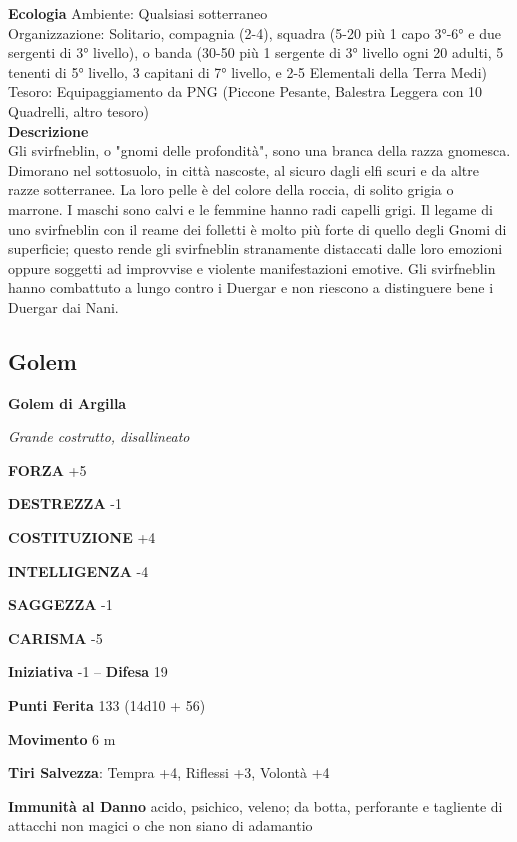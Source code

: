 \begin{multicols}{2}
\textbf{Ecologia}
Ambiente: Qualsiasi sotterraneo\\
Organizzazione: Solitario, compagnia (2-4), squadra (5-20 più 1 capo 3°-6° e due sergenti di 3° livello), o banda (30-50 più 1 sergente di 3° livello ogni 20 adulti, 5 tenenti di 5° livello, 3 capitani di 7° livello, e 2-5 Elementali della Terra Medi)\\
Tesoro: Equipaggiamento da PNG (Piccone Pesante, Balestra Leggera con 10 Quadrelli, altro tesoro)\\
\textbf{Descrizione}\\
Gli svirfneblin, o "gnomi delle profondità", sono una branca della razza gnomesca. Dimorano nel sottosuolo, in città nascoste, al sicuro dagli elfi scuri e da altre razze sotterranee. La loro pelle è del colore della roccia, di solito grigia o marrone. I maschi sono calvi e le femmine hanno radi capelli grigi. Il legame di uno svirfneblin con il reame dei folletti è molto più forte di quello degli Gnomi di superficie; questo rende gli svirfneblin stranamente distaccati dalle loro emozioni oppure soggetti ad improvvise e violente manifestazioni emotive. Gli svirfneblin hanno combattuto a lungo contro i Duergar e non riescono a distinguere bene i Duergar dai Nani.\\



\subsection{Golem}

\medskip{}\textbf{Golem di Argilla}

\emph{Grande costrutto, disallineato}

\textbf{FORZA} +5

\textbf{DESTREZZA} -1

\textbf{COSTITUZIONE} +4

\textbf{INTELLIGENZA} -4

\textbf{SAGGEZZA} -1

\textbf{CARISMA} -5

\textbf{Iniziativa} -1 -- \textbf{Difesa} 19

\textbf{Punti Ferita} 133 (14d10 + 56)

\textbf{Movimento} 6 m

\textbf{Tiri Salvezza}: Tempra +4, Riflessi +3, Volontà +4

\textbf{Immunità al Danno} acido, psichico, veleno; da botta, perforante e tagliente di attacchi non magici o che non siano di adamantio


\end{multicols}
